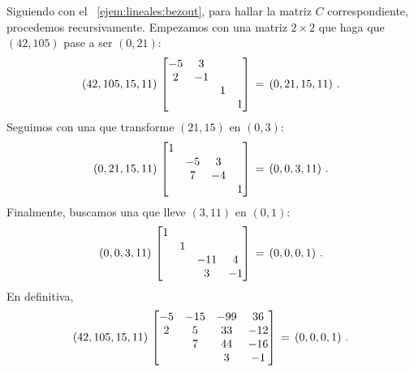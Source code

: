 
\begin{ejemLineales}\label{ejem:lineales:resolubilidad:matriz}
	Siguiendo con el \ejemname~\ref{ejem:lineales:bezout},
	para hallar la matriz $C$ correspondiente, procedemos
	recursivamente. Empezamos con una matriz $2\times 2$
	que haga que $(42,105)$ pase a ser $(0,21)$:
	\begin{displaymath}
		(42,105,15,11)\,
		\begin{bmatrix}
			-5 & 3 & & \\
			2 & -1 & & \\
			& & 1 & \\
			& & & 1
		\end{bmatrix} \,=\, (0,21,15,11)
		\text{ .}
	\end{displaymath}
	Seguimos con una que transforme $(21,15)$ en $(0,3)$:
	\begin{displaymath}
		(0,21,15,11)\,
		\begin{bmatrix}
			1 & & & \\
			& -5 & 3 & \\
			& 7 & -4 & \\
			& & & 1
		\end{bmatrix} \,=\, (0,0,3,11)
		\text{ .}
	\end{displaymath}
	Finalmente, buscamos una que lleve $(3,11)$ en $(0,1)$:
	\begin{displaymath}
		(0,0,3,11)\,
		\begin{bmatrix}
			1 & & & \\
			& 1 & & \\
			& & -11 & 4 \\
			& & 3 & -1
		\end{bmatrix} \,=\, (0,0,0,1)
		\text{ .}
	\end{displaymath}
	En definitiva,
	\begin{displaymath}
		(42,105,15,11)\,
		\begin{bmatrix}
			-5 & -15 & -99 & 36 \\
			2 & 5 & 33 & -12 \\
			& 7 & 44 & -16 \\
			& & 3 & -1
		\end{bmatrix} \,=\, (0,0,0,1)
		\text{ .}
	\end{displaymath}
\end{ejemLineales}

